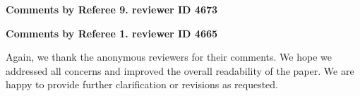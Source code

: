 \documentclass{letter}
\begin{document}
{\bf Comments by Referee 9. reviewer ID 4673}

{\bf Comments by Referee 1. reviewer ID 4665}

Again, we thank the anonymous reviewers for their comments. We hope we 
addressed all concerns and improved the overall readability of the paper. We are happy to provide further clarification or revisions as requested.





\small
%


\end{document}
